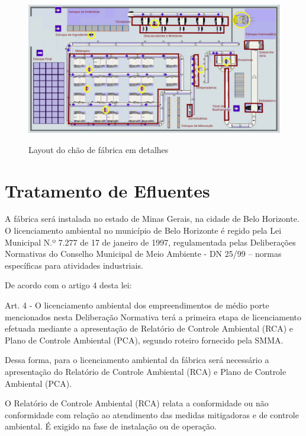 \documentclass[
	12pt,				%
	openright,			%
	oneside,			%
	a4paper,			%
	english,			%
	french,				%
	spanish,			%
	brazil				%
	]{abntex2}
\begin{document}
\begin{figure}[H]
\begin{center}
\caption{Layout do chão de fábrica em detalhes}
\includegraphics[scale=0.3]{../../Pictures/WhatsApp Image 2022-09-17 at 14.55.23 (1).jpeg} 
\label{lay2}
\end{center}
\end{figure}

\newpage
\chapter{Tratamento de Efluentes}

A fábrica será instalada no estado de Minas Gerais, na cidade de Belo Horizonte. O licenciamento ambiental no município de Belo Horizonte é regido pela Lei Municipal N.º 7.277 de 17 de janeiro de 1997, regulamentada pelas Deliberações Normativas do Conselho Municipal de Meio Ambiente - DN 25/99 – normas específicas para atividades industriais.

De acordo com o artigo 4 desta lei:

Art. 4 - O licenciamento ambiental dos empreendimentos de médio porte mencionados nesta Deliberação Normativa terá a primeira etapa de licenciamento efetuada mediante a apresentação de Relatório de Controle Ambiental (RCA) e Plano de Controle Ambiental (PCA), segundo roteiro fornecido pela SMMA.

Dessa forma, para o licenciamento ambiental da fábrica será necessário a apresentação do Relatório de Controle Ambiental (RCA) e Plano de Controle Ambiental (PCA). 

O Relatório de Controle Ambiental (RCA) relata a conformidade ou não conformidade com relação ao atendimento das medidas mitigadoras e de controle ambiental. É exigido na fase de instalação ou de operação.
\end{document}
